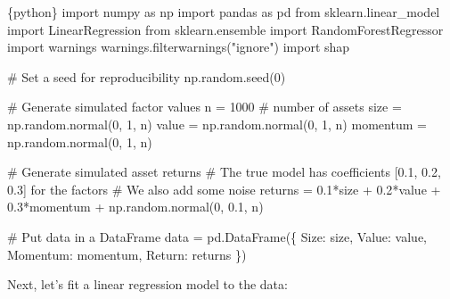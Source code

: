 \documentclass[
  letterpaper,
  DIV=11,
  numbers=noendperiod]{scrartcl}
\newenvironment{Shaded}{\begin{snugshade}}{\end{snugshade}}
\newcommand{\CommentTok}[1]{\textcolor[rgb]{0.37,0.37,0.37}{#1}}
\newcommand{\DecValTok}[1]{\textcolor[rgb]{0.68,0.00,0.00}{#1}}
\newcommand{\FloatTok}[1]{\textcolor[rgb]{0.68,0.00,0.00}{#1}}
\newcommand{\ImportTok}[1]{\textcolor[rgb]{0.00,0.46,0.62}{#1}}
\newcommand{\InformationTok}[1]{\textcolor[rgb]{0.37,0.37,0.37}{#1}}
\newcommand{\NormalTok}[1]{\textcolor[rgb]{0.00,0.23,0.31}{#1}}
\newcommand{\OperatorTok}[1]{\textcolor[rgb]{0.37,0.37,0.37}{#1}}
\newcommand{\StringTok}[1]{\textcolor[rgb]{0.13,0.47,0.30}{#1}}
\begin{document}
\begin{Shaded}
\begin{Highlighting}[]
\InformationTok{\textasciigrave{}\textasciigrave{}\textasciigrave{}\{python\}}
\ImportTok{import}\NormalTok{ numpy }\ImportTok{as}\NormalTok{ np}
\ImportTok{import}\NormalTok{ pandas }\ImportTok{as}\NormalTok{ pd}
\ImportTok{from}\NormalTok{ sklearn.linear\_model }\ImportTok{import}\NormalTok{ LinearRegression}
\ImportTok{from}\NormalTok{ sklearn.ensemble }\ImportTok{import}\NormalTok{ RandomForestRegressor}
\ImportTok{import}\NormalTok{ warnings}
\NormalTok{warnings.filterwarnings(}\StringTok{"ignore"}\NormalTok{)}
\ImportTok{import}\NormalTok{ shap}

\CommentTok{\# Set a seed for reproducibility}
\NormalTok{np.random.seed(}\DecValTok{0}\NormalTok{)}

\CommentTok{\# Generate simulated factor values}
\NormalTok{n }\OperatorTok{=} \DecValTok{1000}  \CommentTok{\# number of assets}
\NormalTok{size }\OperatorTok{=}\NormalTok{ np.random.normal(}\DecValTok{0}\NormalTok{, }\DecValTok{1}\NormalTok{, n)}
\NormalTok{value }\OperatorTok{=}\NormalTok{ np.random.normal(}\DecValTok{0}\NormalTok{, }\DecValTok{1}\NormalTok{, n)}
\NormalTok{momentum }\OperatorTok{=}\NormalTok{ np.random.normal(}\DecValTok{0}\NormalTok{, }\DecValTok{1}\NormalTok{, n)}

\CommentTok{\# Generate simulated asset returns}
\CommentTok{\# The true model has coefficients [0.1, 0.2, 0.3] for the factors}
\CommentTok{\# We also add some noise}
\NormalTok{returns }\OperatorTok{=} \FloatTok{0.1}\OperatorTok{*}\NormalTok{size }\OperatorTok{+} \FloatTok{0.2}\OperatorTok{*}\NormalTok{value }\OperatorTok{+} \FloatTok{0.3}\OperatorTok{*}\NormalTok{momentum }\OperatorTok{+}\NormalTok{ np.random.normal(}\DecValTok{0}\NormalTok{, }\FloatTok{0.1}\NormalTok{, n)}

\CommentTok{\# Put data in a DataFrame}
\NormalTok{data }\OperatorTok{=}\NormalTok{ pd.DataFrame(\{}
    \StringTok{\textquotesingle{}Size\textquotesingle{}}\NormalTok{: size,}
    \StringTok{\textquotesingle{}Value\textquotesingle{}}\NormalTok{: value,}
    \StringTok{\textquotesingle{}Momentum\textquotesingle{}}\NormalTok{: momentum,}
    \StringTok{\textquotesingle{}Return\textquotesingle{}}\NormalTok{: returns}
\NormalTok{\})}
\InformationTok{\textasciigrave{}\textasciigrave{}\textasciigrave{}}
\end{Highlighting}
\end{Shaded}

Next, let's fit a linear regression model to the data:
\end{document}
